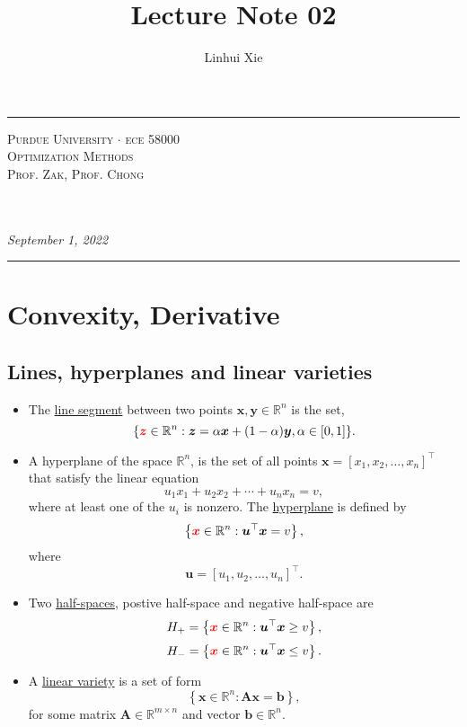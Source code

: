 \documentclass[12pt,thmsa]{article}
\author{Linhui Xie}
\title{Lecture Note 02}
\makeatletter
\def\maketitle{%
	\par
	\hrule height 1.5pt\vspace{1ex}
	\par\noindent
	
	\begin{minipage}{0.5\textwidth}
		\scshape
		Purdue University \(\cdot\) ece 58000 \\[1ex]
		Optimization Methods \\
		Prof. Zak, Prof. Chong
	\end{minipage}
	\begin{minipage}{0.45\textwidth}
		\raggedleft
		\MakeTextUppercase{{\@title}}\\[0.3ex] %
		\textit{\@author}\\[0.2ex]
		\textit{September 1, 2022}
	\end{minipage}
	\par\vspace{1ex}
	\hrule height 1.5pt\vspace{1ex}
	\par
}
\makeatother
\begin{document}
\maketitle

\setcounter{section}{1}
\section{Convexity, Derivative\medskip}

\setcounter{section}{2}

\subsection{Lines, hyperplanes and linear varieties}

\begin{itemize}
	\item The \underline{line segment} between two points \(\boldsymbol{x}, \boldsymbol{y} \in \mathbb{R}^{n}\) is the set,
	\[
	\{{\color{red}{\boldsymbol{z}}} \in \mathbb{R}^{n}: \boldsymbol{z} = \alpha \boldsymbol{x}+(1-\alpha) \boldsymbol{y}, \alpha \in[0,1]\}.
	\]
	
	\item A hyperplane of the space \(\mathbb{R}^{n} \), is the set of all points \(\boldsymbol{x}=\left[x_{1}, x_{2}, \ldots, x_{n}\right]^{\top}\) that satisfy the linear equation
	\[
	u_{1} x_{1}+u_{2} x_{2}+\cdots+u_{n} x_{n}=v,
	\]
	where at least one of the \(u_{i}\) is nonzero. The \underline{hyperplane}  is defined by
	\[
	\left\{{\color{red}{\boldsymbol{x}}} \in \mathbb{R}^{n}: \boldsymbol{u}^{\top} \boldsymbol{x}=v\right\},
	\]where
	\[
	\boldsymbol{u}=\left[u_{1}, u_{2}, \ldots, u_{n}\right]^{\top}.
	\]
	
	\item Two \underline{half-spaces}, postive half-space and negative half-space are
	\[ H_{+}=\left\{{\color{red}{\boldsymbol{x}}} \in \mathbb{R}^{n}: \boldsymbol{u}^{\top} \boldsymbol{x} \geq v\right\}, \]
	\[ H_{-}=\left\{{\color{red}{\boldsymbol{x}}} \in \mathbb{R}^{n}: \boldsymbol{u}^{\top} \boldsymbol{x} \leq v\right\}. \]
	
	\item  A \underline{linear variety} is a set of form
	\[ \left\{\boldsymbol{x} \in \mathbb{R}^{n} : \boldsymbol{A}\boldsymbol{x} = \boldsymbol{b} \right\},  \]
	for some matrix \(\boldsymbol{A} \in \mathbb{R}^{m \times n}\) and vector \(\boldsymbol{b} \in \mathbb{R}^{n}\).
\end{itemize}
\end{document}

